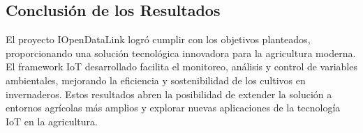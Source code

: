 \subsection{Conclusión de los Resultados}
El proyecto IOpenDataLink logró cumplir con los objetivos planteados, proporcionando una solución tecnológica innovadora para la agricultura moderna. El framework IoT desarrollado facilita el monitoreo, análisis y control de variables ambientales, mejorando la eficiencia y sostenibilidad de los cultivos en invernaderos. Estos resultados abren la posibilidad de extender la solución a entornos agrícolas más amplios y explorar nuevas aplicaciones de la tecnología IoT en la agricultura.
